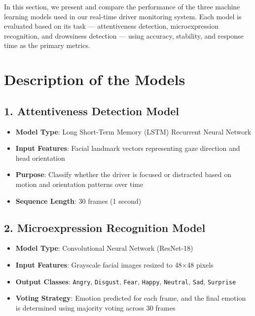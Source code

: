 \documentclass[
  letterpaper,
  DIV=11,
  numbers=noendperiod]{scrreport}
\providecommand{\tightlist}{%
  \setlength{\itemsep}{0pt}\setlength{\parskip}{0pt}}
\begin{document}
In this section, we present and compare the performance of the three
machine learning models used in our real-time driver monitoring system.
Each model is evaluated based on its task --- attentiveness detection,
microexpression recognition, and drowsiness detection --- using
accuracy, stability, and response time as the primary metrics.

\section{Description of the Models}\label{description-of-the-models}

\subsection{1. Attentiveness Detection
Model}\label{attentiveness-detection-model}

\begin{itemize}
\tightlist
\item
  \textbf{Model Type}: Long Short-Term Memory (LSTM) Recurrent Neural
  Network\\
\item
  \textbf{Input Features}: Facial landmark vectors representing gaze
  direction and head orientation\\
\item
  \textbf{Purpose}: Classify whether the driver is focused or distracted
  based on motion and orientation patterns over time\\
\item
  \textbf{Sequence Length}: 30 frames (1 second)
\end{itemize}

\subsection{2. Microexpression Recognition
Model}\label{microexpression-recognition-model}

\begin{itemize}
\tightlist
\item
  \textbf{Model Type}: Convolutional Neural Network (ResNet-18)\\
\item
  \textbf{Input Features}: Grayscale facial images resized to 48×48
  pixels\\
\item
  \textbf{Output Classes}: \texttt{Angry}, \texttt{Disgust},
  \texttt{Fear}, \texttt{Happy}, \texttt{Neutral}, \texttt{Sad},
  \texttt{Surprise}\\
\item
  \textbf{Voting Strategy}: Emotion predicted for each frame, and the
  final emotion is determined using majority voting across 30 frames
\end{itemize}
\end{document}
